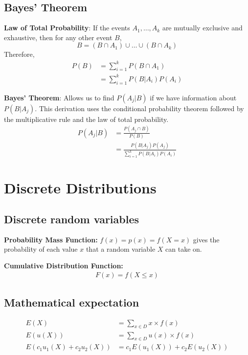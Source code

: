 \documentclass{article}
\begin{document}
\begin{multicols*}{2}
\subsection{Bayes' Theorem}

\textbf{Law of Total Probability}: If the events $A_1, \ldots, A_k$ are mutually exclusive and exhaustive, then for any other event $B$,
\begin{equation*}
    B = (B \cap A_1) \cup \ldots \cup (B \cap A_k)
\end{equation*}
Therefore,
\begin{align*}
    P(B) &= \sum_{i = 1}^k P(B \cap A_1) \\
    &= \sum_{i = 1}^k P(B|A_i) P(A_i)
\end{align*}

\textbf{Bayes' Theorem}:
Allows us to find $P(A_j|B)$ if we have information about $P(B|A_j)$. This derivation uses the conditional probability theorem followed by the multiplicative rule and the law of total probability.
\begin{align*}
    P(A_j|B) &= \frac{P(A_j \cap B)}{P(B)} \\
    &= \frac{P(B|A_j) P(A_j)}{\sum_{i = 1}^k P(B|A_i) P(A_i)}
\end{align*}

\section{Discrete Distributions}

\subsection{Discrete random variables}

\textbf{Probability Mass Function:} $f(x) = p(x) = f(X = x)$ gives the probability of each value $x$ that a random variable $X$ can take on.

\textbf{Cumulative Distribution Function:}
\begin{align*}
    F(x) = f(X \leq x)
\end{align*}

\subsection{Mathematical expectation}
\begin{align*}
    E(X) &= \sum_{x \in D} x \times f(x) \\
    E(u(X)) &= \sum_{x \in D} u(x) \times f(x) \\
    E(c_1 u_1(X) + c_2 u_2(X)) &= c_1 E(u_1(X)) + c_2 E(u_2(X))
\end{align*}


\end{multicols*}
\end{document}
